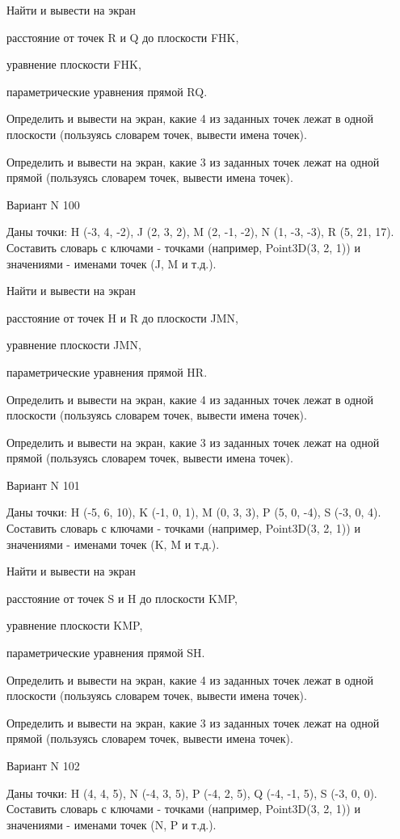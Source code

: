\documentclass[11pt]{report}
\begin{document}
Найти и вывести на экран


расстояние от точек R и Q до плоскости FHK,


уравнение плоскости FHK,


параметрические уравнения прямой RQ.


Определить и вывести на экран, какие 4 из заданных точек лежат в одной плоскости (пользуясь словарем точек, вывести имена точек).


Определить и вывести на экран, какие 3 из заданных точек лежат на одной прямой (пользуясь словарем точек, вывести имена точек).

\newpage
Вариант N 100

Даны точки: H (-3, 4, -2), J (2, 3, 2), M (2, -1, -2), N (1, -3, -3), R (5, 21, 17).
Составить словарь с ключами - точками (например, Point3D(3, 2, 1)) и значениями - именами точек (J, M и т.д.).


Найти и вывести на экран


расстояние от точек H и R до плоскости JMN,


уравнение плоскости JMN,


параметрические уравнения прямой HR.


Определить и вывести на экран, какие 4 из заданных точек лежат в одной плоскости (пользуясь словарем точек, вывести имена точек).


Определить и вывести на экран, какие 3 из заданных точек лежат на одной прямой (пользуясь словарем точек, вывести имена точек).

\newpage
Вариант N 101

Даны точки: H (-5, 6, 10), K (-1, 0, 1), M (0, 3, 3), P (5, 0, -4), S (-3, 0, 4).
Составить словарь с ключами - точками (например, Point3D(3, 2, 1)) и значениями - именами точек (K, M и т.д.).


Найти и вывести на экран


расстояние от точек S и H до плоскости KMP,


уравнение плоскости KMP,


параметрические уравнения прямой SH.


Определить и вывести на экран, какие 4 из заданных точек лежат в одной плоскости (пользуясь словарем точек, вывести имена точек).


Определить и вывести на экран, какие 3 из заданных точек лежат на одной прямой (пользуясь словарем точек, вывести имена точек).

\newpage
Вариант N 102

Даны точки: H (4, 4, 5), N (-4, 3, 5), P (-4, 2, 5), Q (-4, -1, 5), S (-3, 0, 0).
Составить словарь с ключами - точками (например, Point3D(3, 2, 1)) и значениями - именами точек (N, P и т.д.).
\end{document}
